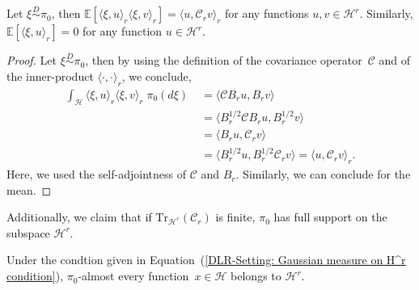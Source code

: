 \begin{proposition}
\label{DLR-Setting: Proposition Gaussian measure}
 Let $\xi \stackrel{D}{\sim} \pi_0$, then $\mathbb{E} [\langle \xi, u \rangle_r \langle \xi , v \rangle_r ] = \langle u , \mathcal{C}_r v \rangle_r$ for any functions $u,v \in \mathcal{H}^r$. Similarly, $\mathbb{E} [\langle \xi, u \rangle_r  ] = 0$ for any function $u \in \mathcal{H}^r$.
\end{proposition}

\begin{proof}
 Let $\xi \stackrel{D}{\sim} \pi_0$, then by using the definition of the covariance operator~$\mathcal{C}$ and of the inner-product $\langle \cdot, \cdot \rangle_r$, we conclude,
 \begin{align*}
  \int_{\mathcal{H}} \langle \xi, u \rangle_r \langle \xi , v \rangle_r \; \pi_0 (d\xi) & \; = \langle \mathcal{C} B_r u , B_r v \rangle \\
  & \; = \langle B_r^{1/2} \mathcal{C} B_r u , B_r^{1/2} v \rangle \\
  & \; = \langle  B_r u , \mathcal{C}_r v \rangle \\	
  & \; = \langle  B_r^{1/2} u , B_r^{1/2} \mathcal{C}_r v \rangle = \langle u, \mathcal{C}_r v \rangle_r.
 \end{align*}
 Here, we used the self-adjointness of $\mathcal{C}$ and $B_r$. Similarly, we can conclude for the mean.

\end{proof}

Additionally, we claim that if $\text{Tr}_{\mathcal{H}^r}(\mathcal{C}_r)$ is finite, $\pi_0$ has full support on the subspace $\mathcal{H}^r$.

\begin{proposition}
\label{DLR-Setting: Proposition Full support}
 Under the condtion given in Equation~(\ref{DLR-Setting: Gaussian measure on H^r condition}), $\pi_0 $-almost every function~$x \in \mathcal{H}$ belongs to $\mathcal{H}^r$.
\end{proposition}

